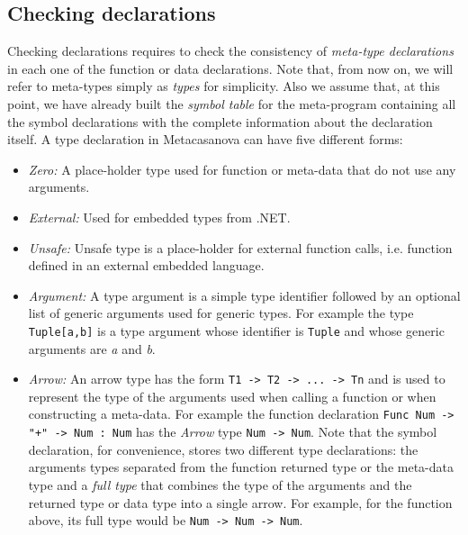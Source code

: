 \subsection{Checking declarations}
\label{subsec:ch_metacasanova_checking_declarations}
Checking declarations requires to check the consistency of \textit{meta-type declarations} in each one of the function or data declarations. Note that, from now on, we will refer to meta-types simply as \textit{types} for simplicity. Also we assume that, at this point, we have already built the \textit{symbol table} for the meta-program containing all the symbol declarations with the complete information about the declaration itself. A type declaration in Metacasanova can have five different forms:

\begin{itemize}
	\item \textit{Zero:} A place-holder type used for function or meta-data that do not use any arguments.
	
	\item \textit{External:} Used for embedded types from .NET.
	
	\item \textit{Unsafe:} Unsafe type is a place-holder for external function calls, i.e. function defined in an external embedded language.
	
	\item \textit{Argument:} A type argument is a simple type identifier followed by an optional list of generic arguments used for generic types. For example the type \texttt{Tuple[a,b]} is a type argument whose identifier is \texttt{Tuple} and whose generic arguments are \textit{a} and \textit{b}.
	
	\item \textit{Arrow:} An arrow type has the form \texttt{T1 -> T2 -> ... -> Tn} and is used to represent the type of the arguments used when calling a function or when constructing a meta-data. For example the function declaration \texttt{Func Num -> "+" -> Num : Num} has the \textit{Arrow} type \texttt{Num -> Num}. Note that the symbol declaration, for convenience, stores two different type declarations: the arguments types separated from the function returned type or the meta-data type and a \textit{full type} that combines the type of the arguments and the returned type or data type into a single arrow. For example, for the function above, its full type would be \texttt{Num -> Num -> Num}.
\end{itemize}

